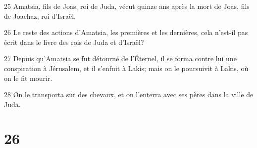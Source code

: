 \par 25 Amatsia, fils de Joas, roi de Juda, vécut quinze ans après la mort de Joas, fils de Joachaz, roi d'Israël.
\par 26 Le reste des actions d'Amatsia, les premières et les dernières, cela n'est-il pas écrit dans le livre des rois de Juda et d'Israël?
\par 27 Depuis qu'Amatsia se fut détourné de l'Éternel, il se forma contre lui une conspiration à Jérusalem, et il s'enfuit à Lakis; mais on le poursuivit à Lakis, où on le fit mourir.
\par 28 On le transporta sur des chevaux, et on l'enterra avec ses pères dans la ville de Juda.

\chapter{26}

